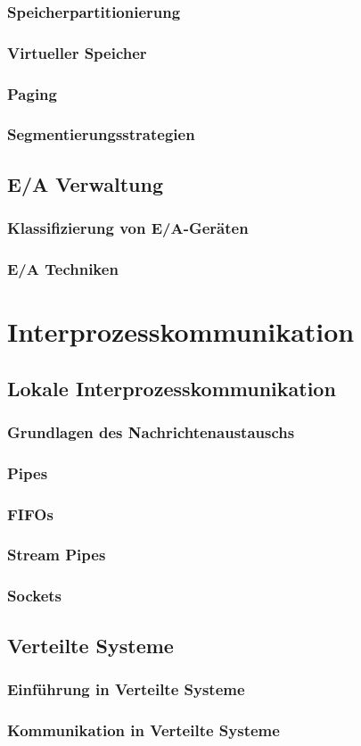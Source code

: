 \documentclass{article}
\begin{document}
\subsubsection{Speicherpartitionierung}
\subsubsection{Virtueller Speicher}
\subsubsection{Paging}
\subsubsection{Segmentierungsstrategien}
\subsection{E/A Verwaltung}
\subsubsection{Klassifizierung von E/A-Geräten}
\subsubsection{E/A Techniken}

\newpage
\section{Interprozesskommunikation}
\subsection{Lokale Interprozesskommunikation}
\subsubsection{Grundlagen des Nachrichtenaustauschs}
\subsubsection{Pipes}
\subsubsection{FIFOs}
\subsubsection{Stream Pipes}
\subsubsection{Sockets}
\subsection{Verteilte Systeme}
\subsubsection{Einführung in Verteilte Systeme}
\subsubsection{Kommunikation in Verteilte Systeme}
\end{document}
